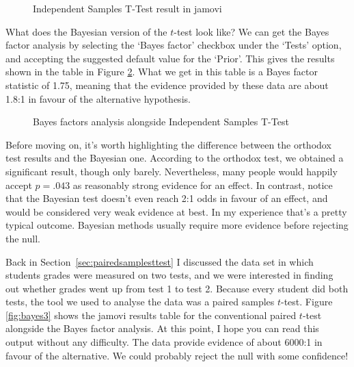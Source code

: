 \begin{figure}[ht]
\begin{center}
\caption{Independent Samples T-Test result in jamovi}
\label{fig:bayes1}
\HR
\end{center}
\end{figure}

What does the Bayesian version of the $t$-test look like? We can get the Bayes factor analysis by selecting the `Bayes factor' checkbox under the `Tests' option, and accepting the suggested default value for the `Prior'. This gives the results shown in the table in Figure \ref{fig:bayes2}. What we get in this table is a Bayes factor statistic of 1.75, meaning that the evidence provided by these data are about 1.8:1 in favour of the alternative hypothesis. 

\begin{figure}[ht]
\begin{center}
\caption{Bayes factors analysis alongside Independent Samples T-Test}
\label{fig:bayes2}
\HR
\end{center}
\end{figure}


Before moving on, it's worth highlighting the difference between the orthodox test results and the Bayesian one. According to the orthodox test, we obtained a significant result, though only barely. Nevertheless, many people would happily accept $p=.043$ as reasonably strong evidence for an effect. In contrast, notice that the Bayesian test doesn't even reach 2:1 odds in favour of an effect, and would be considered very weak evidence at best. In my experience that's a pretty typical outcome. Bayesian methods usually require more evidence before rejecting the null.


Back in Section~\ref{sec:pairedsamplesttest} I discussed the  data set in which students grades were measured on two tests, and we were interested in finding out whether grades went up from test 1 to test 2. Because every student did both tests, the tool we used to analyse the data was a paired samples $t$-test. Figure \ref{fig:bayes3} shows the jamovi results table for the conventional paired $t$-test alongside the Bayes factor analysis. At this point, I hope you can read this output without any difficulty. The data provide evidence of about 6000:1 in favour of the alternative. We could probably reject the null with some confidence!


